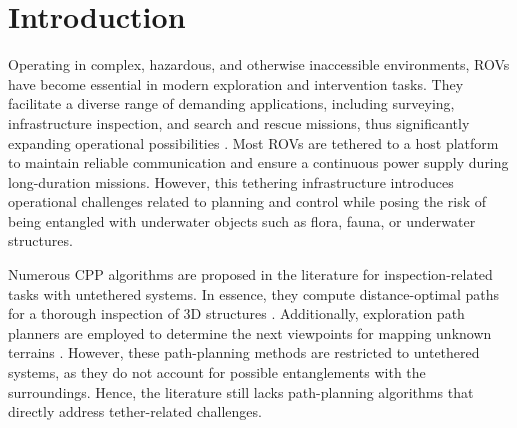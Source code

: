 \section{Introduction}
\label{sec:introduction}

%
%
%

Operating in complex, hazardous, and otherwise inaccessible environments, \acp{ROV} have become essential in modern exploration and intervention tasks. They facilitate a diverse range of demanding applications, including surveying, infrastructure inspection, and search and rescue missions, thus significantly expanding operational possibilities \cite{amer2023unav, amer2025modelling}. Most \acp{ROV} are tethered to a host platform to maintain reliable communication and ensure a continuous power supply during long-duration missions. However, this tethering infrastructure introduces operational challenges related to planning and control while posing the risk of being entangled with underwater objects such as flora, fauna, or underwater structures.



Numerous \ac{CPP} algorithms are proposed in the literature for inspection-related tasks with untethered systems. In essence, they compute distance-optimal paths for a thorough inspection of 3D structures \cite{bircher2015structural,feng2024fc, amer2023visual}.  Additionally, exploration path planners are employed to determine the next viewpoints for mapping unknown terrains \cite{dang2020graph}. However, these path-planning methods are restricted to untethered systems, as they do not account for possible entanglements with the surroundings. Hence, the literature still lacks path-planning algorithms that directly address tether-related challenges.

